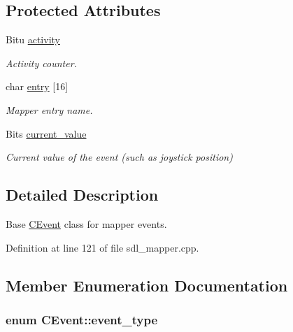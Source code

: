 \subsection*{Protected Attributes}
\begin{DoxyCompactItemize}
\item 
\hypertarget{classCEvent_a487786e4e537594bf963e96aecae85cd}{Bitu \hyperlink{classCEvent_a487786e4e537594bf963e96aecae85cd}{activity}}\label{classCEvent_a487786e4e537594bf963e96aecae85cd}

\begin{DoxyCompactList}\small\item\em Activity counter. \end{DoxyCompactList}\item 
\hypertarget{classCEvent_a20cca21cb3c606f3161a2757c1ba466d}{char \hyperlink{classCEvent_a20cca21cb3c606f3161a2757c1ba466d}{entry} \mbox{[}16\mbox{]}}\label{classCEvent_a20cca21cb3c606f3161a2757c1ba466d}

\begin{DoxyCompactList}\small\item\em Mapper entry name. \end{DoxyCompactList}\item 
\hypertarget{classCEvent_a7bbacdb8e3c5ee41ce13af19dc21db2d}{Bits \hyperlink{classCEvent_a7bbacdb8e3c5ee41ce13af19dc21db2d}{current\-\_\-value}}\label{classCEvent_a7bbacdb8e3c5ee41ce13af19dc21db2d}

\begin{DoxyCompactList}\small\item\em Current value of the event (such as joystick position) \end{DoxyCompactList}\end{DoxyCompactItemize}


\subsection{Detailed Description}
Base \hyperlink{classCEvent}{C\-Event} class for mapper events. 

Definition at line 121 of file sdl\-\_\-mapper.\-cpp.



\subsection{Member Enumeration Documentation}
\hypertarget{classCEvent_a93a65775636793dfcabe38d14739c2bd}{
\subsubsection[{event\-\_\-type}]{\setlength{\rightskip}{0pt plus 5cm}enum {\bf C\-Event\-::event\-\_\-type}}}\label{classCEvent_a93a65775636793dfcabe38d14739c2bd}


